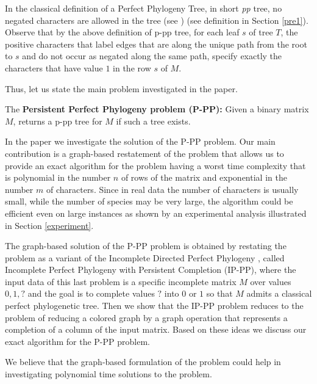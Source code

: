 \documentclass{llncs}
\begin{document}
In the classical  definition of a  Perfect Phylogeny Tree,  in short {\em pp} tree, 
no negated characters are allowed in the tree (see \cite{Setubal}) (see definition in Section \ref{pre1}). Observe that by the above definition  of p-pp tree,  for each  leaf $s$ of tree $T$, the positive characters that label edges 
that are along the unique path from the root to $s$ and
do not occur as  negated along the same path, specify  exactly the characters
that have value $1$ in the row    $s$ of $M$.

Thus, let us state the main problem investigated in the paper.

\noindent

{The \bf  Persistent Perfect Phylogeny
 problem (P-PP):} Given a binary matrix $M$,  returns a p-pp tree for $M$ if such a tree exists.
 

 
 \vspace{.2in}
 
 In the paper we investigate the  solution of the P-PP problem. Our main contribution is a graph-based restatement of the problem that allows us to provide an exact algorithm for the problem having a worst time complexity that is polynomial in the number  $n$ of rows of the matrix and exponential   in the number $m$ of characters.  
Since in  real data the number of characters is usually small, while the number of species may be very large, the algorithm could be  efficient even on large instances  as shown by an experimental analysis illustrated in Section \ref{experiment}.
 


 The graph-based solution of   the P-PP problem is obtained by  restating the problem as a  variant of the Incomplete Directed Perfect Phylogeny \cite{Sha}, called Incomplete  Perfect Phylogeny with Persistent Completion (IP-PP), where the input data of this last problem is a specific incomplete matrix  $M$ over values $0,1,?$  and the goal is to complete values $?$ into $0$ or $1$ so that $M$ admits a classical perfect phylogenetic tree.
Then we show  that the IP-PP problem reduces to the problem of reducing a colored graph by a graph operation  that represents  a completion of a column of the input matrix.    Based on these ideas we discuss our exact algorithm for the P-PP problem.
 
  We believe that the graph-based formulation of the problem could help in investigating polynomial time solutions to the problem. 

 
\end{document}
